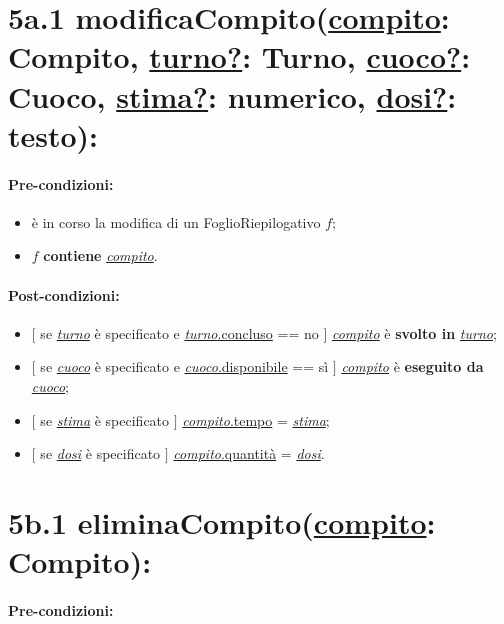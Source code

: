 \section*{5a.1 modificaCompito(\underline{compito}: Compito, \underline{turno?}: Turno, \underline{cuoco?}: Cuoco, \underline{stima?}: numerico, \underline{dosi?}: testo):}

\paragraph{Pre-condizioni:}

\begin{itemize}
    \item è in corso la modifica di un FoglioRiepilogativo $f$;
    \item $f$ \textbf{contiene} \underline{\textit{compito}}.
\end{itemize}

\paragraph{Post-condizioni:} 

\begin{itemize}
    \item $[$ se \underline{\textit{turno}} è specificato e \underline{\textit{turno}.concluso} == no $]$ \underline{\textit{compito}} è \textbf{svolto in} \underline{\textit{turno}};
    \item $[$ se \underline{\textit{cuoco}} è specificato e \underline{\textit{cuoco}.disponibile} == sì $]$ \underline{\textit{compito}} è \textbf{eseguito da} \underline{\textit{cuoco}};
    \item $[$ se \underline{\textit{stima}} è specificato $]$ \underline{\textit{compito}.tempo} = \underline{\textit{stima}};
    \item $[$ se \underline{\textit{dosi}} è specificato $]$ \underline{\textit{compito}.quantità} = \underline{\textit{dosi}}.
\end{itemize}

\section*{5b.1 eliminaCompito(\underline{compito}: Compito):}

\paragraph{Pre-condizioni:}

